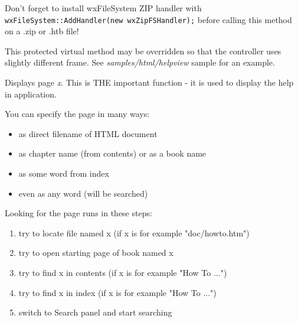 


Don't forget to install wxFileSystem ZIP handler with
{\tt wxFileSystem::AddHandler(new wxZipFSHandler);} before calling this method
on a .zip or .htb file!

\label{wxhtmlhelpcontrollercreatehelpframe}


This protected virtual method may be overridden so that the controller
uses slightly different frame. See {\it samples/html/helpview} sample for
an example.

\label{wxhtmlhelpcontrollerdisplay}


Displays page {\it x}. This is THE important function - it is used to display
the help in application.

You can specify the page in many ways:

\begin{itemize}\itemsep=0pt
\item as direct filename of HTML document
\item as chapter name (from contents) or as a book name
\item as some word from index
\item even as any word (will be searched)
\end{itemize}

Looking for the page runs in these steps:

\begin{enumerate}\itemsep=0pt
\item try to locate file named x (if x is for example "doc/howto.htm")
\item try to open starting page of book named x
\item try to find x in contents (if x is for example "How To ...")
\item try to find x in index (if x is for example "How To ...")
\item switch to Search panel and start searching
\end{enumerate}

